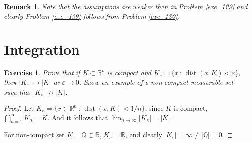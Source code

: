 \documentclass[11pt]{book}
\newtheorem{exercise}{Exercise}[section]
\newtheorem{remark}{Remark}[chapter]
\theoremstyle{definition}
\numberwithin{equation}{chapter}
\begin{document}
\begin{remark}
Note that the assumptions are weaker than in Problem \ref{exe_129} and clearly Problem \ref{exe_129} follows from Problem \ref{exe_130}.%
\end{remark}

\medskip

\section{Integration}

\begin{exercise}
Prove that if $K\subset\mathbb{R}^n$ is compact and $K_\varepsilon=\{x \,:\, \operatorname{dist}(x,K)<\varepsilon\}$, then $\left|K_\varepsilon\right| \to \left|K\right|$ as $\varepsilon\to 0$.
Show an example of a non-compact measurable set such that $\left|K_\varepsilon\right| \not\to \left|K\right|$.
\end{exercise}
\begin{proof}
Let $K_n = \{x \in \mathbb{R}^n \,:\, \operatorname{dist}(x,K) < 1/n\}$, since $K$ is compact, $\bigcap^\infty_{n=1} K_n = K$. And it follows that $\lim_{n\to\infty} \left|K_n\right| = \left|K\right|$.

For non-compact set $K = \mathbb{Q} \subset \mathbb{R}$, $K_\varepsilon = \mathbb{R}$, and clearly $\left|K_\varepsilon\right| = \infty \neq \left|\mathbb{Q}\right| = 0$.
\end{proof}

\medskip
\end{document}

